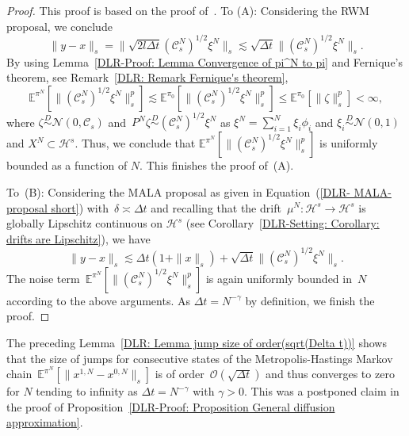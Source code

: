 \begin{proof}
  This proof is based on the proof of~\autocite[Lemma 4.2]{Pillai2012}. To (A): Considering the RWM proposal, we conclude
   \begin{equation*}
      \| y - x \|_s  = \| \sqrt{2l \Delta t} (\mathcal{C}_s^N)^{1/2} \xi^N \|_s  \lesssim \sqrt{\Delta t} \|  (\mathcal{C}_s^N)^{1/2} \xi^N \|_s.
   \end{equation*}
   By using Lemma~\ref{DLR-Proof: Lemma Convergence of pi^N to pi} and Fernique's theorem, see Remark~\ref{DLR: Remark Fernique's theorem},
   \begin{equation*}
     \mathbb{E}^{\pi^N}[\|  (\mathcal{C}_s^N)^{1/2} \xi^N \|_s^p] \lesssim \mathbb{E}^{\pi_0}[\|  (\mathcal{C}_s^N)^{1/2} \xi^N \|_s^p] \leq \mathbb{E}^{\pi_0} [\|  \zeta \|_s^p] < \infty,
   \end{equation*}
   where $\zeta \stackrel{D}{\sim} \mathcal{N}(0, \mathcal{C}_s)$ and~$P^N\zeta \stackrel{D}{\sim} (\mathcal{C}_s^N)^{1/2} \xi^N$ as $\xi^{N} = \sum_{i=1}^{N} \xi_i \phi_i$ and $\xi_i \stackrel{D}{\sim} \mathcal{N}(0,1)$ and $X^N \subset \mathcal{H}^s$. Thus, we conclude that $\mathbb{E}^{\pi^N}[\|  (\mathcal{C}_s^N)^{1/2} \xi^N \|_s^p]$ is uniformly bounded as a function of $N$. This finishes the proof of~(A).
   
   To~(B): Considering the MALA proposal as given in Equation~(\ref{DLR- MALA-proposal short}) with~$\delta \asymp \Delta t$ and recalling that the drift~$\mu^N: \mathcal{H}^s \to \mathcal{H}^s$ is globally Lipschitz continuous on $\mathcal{H}^s$ (see Corollary~\ref{DLR-Setting: Corollary: drifts are Lipschitz}), we have
   \begin{equation*}
     \| y - x \|_s    \lesssim \Delta t ( 1 + \| x \|_s) + \sqrt{\Delta t} \|  (\mathcal{C}_s^N)^{1/2} \xi^N \|_s.
   \end{equation*}
   The noise term~$\mathbb{E}^{\pi^N}[\|  (\mathcal{C}_s^N)^{1/2} \xi^N \|_s^p]$ is again uniformly bounded in~$N$ according to the above arguments. As $\Delta t = N^{-\gamma}$ by definition, we finish the proof.

\end{proof}

\begin{rem}
  The preceding Lemma~\ref{DLR: Lemma jump size of order(sqrt(Delta t))} shows that the size of jumps for consecutive states of the Metropolis-Hastings Markov chain~$\mathbb{E}^{\pi^N} [ \| x^{1,N} -x^{0,N} \|_s ]$ is of order~$\mathcal{O}(\sqrt{\Delta t})$ and thus converges to zero for $N$ tending to infinity as $\Delta t = N^{-\gamma}$ with $\gamma >0$. This was a postponed claim in the proof of Proposition~\ref{DLR-Proof: Proposition General diffusion approximation}.
\end{rem}


